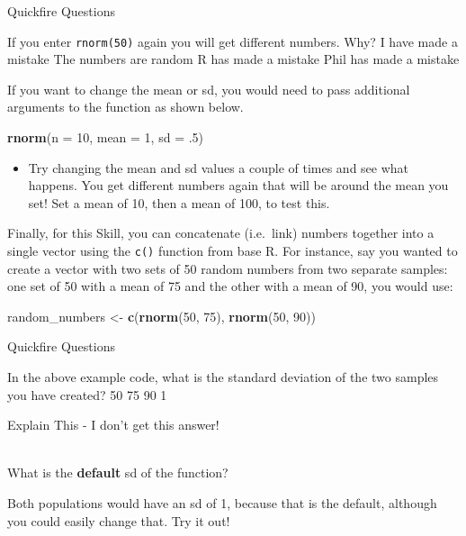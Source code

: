 \documentclass[]{book}
\newenvironment{Shaded}{\begin{snugshade}}{\end{snugshade}}
\newcommand{\DataTypeTok}[1]{\textcolor[rgb]{0.13,0.29,0.53}{#1}}
\newcommand{\DecValTok}[1]{\textcolor[rgb]{0.00,0.00,0.81}{#1}}
\newcommand{\FloatTok}[1]{\textcolor[rgb]{0.00,0.00,0.81}{#1}}
\newcommand{\KeywordTok}[1]{\textcolor[rgb]{0.13,0.29,0.53}{\textbf{#1}}}
\newcommand{\NormalTok}[1]{#1}
\newcommand{\StringTok}[1]{\textcolor[rgb]{0.31,0.60,0.02}{#1}}
\providecommand{\tightlist}{%
  \setlength{\itemsep}{0pt}\setlength{\parskip}{0pt}}
\newenvironment{info}
    {
    \hline\\
    }
    { 
    \\\\\hline
    }
\begin{document}
{Quickfire Questions}

If you enter \texttt{rnorm(50)} again you will get different numbers. Why? I have made a mistake The numbers are random R has made a mistake Phil has made a mistake

If you want to change the mean or sd, you would need to pass additional arguments to the function as shown below.

\begin{Shaded}
\begin{Highlighting}[]
\KeywordTok{rnorm}\NormalTok{(}\DataTypeTok{n =} \DecValTok{10}\NormalTok{, }\DataTypeTok{mean =} \DecValTok{1}\NormalTok{, }\DataTypeTok{sd =} \FloatTok{.5}\NormalTok{)}
\end{Highlighting}
\end{Shaded}

\begin{itemize}
\tightlist
\item
  Try changing the mean and sd values a couple of times and see what happens. You get different numbers again that will be around the mean you set! Set a mean of 10, then a mean of 100, to test this.
\end{itemize}

Finally, for this Skill, you can concatenate (i.e.~link) numbers together into a single vector using the \texttt{c()} function from base R. For instance, say you wanted to create a vector with two sets of 50 random numbers from two separate samples: one set of 50 with a mean of 75 and the other with a mean of 90, you would use:

\begin{Shaded}
\begin{Highlighting}[]
\NormalTok{random_numbers <-}\StringTok{ }\KeywordTok{c}\NormalTok{(}\KeywordTok{rnorm}\NormalTok{(}\DecValTok{50}\NormalTok{, }\DecValTok{75}\NormalTok{),}
                    \KeywordTok{rnorm}\NormalTok{(}\DecValTok{50}\NormalTok{, }\DecValTok{90}\NormalTok{))}
\end{Highlighting}
\end{Shaded}

{Quickfire Questions}

In the above example code, what is the standard deviation of the two samples you have created? 50 75 90 1

Explain This - I don't get this answer!

\begin{info}
What is the \textbf{default} sd of the function?

Both populations would have an sd of 1, because that is the default,
although you could easily change that. Try it out!
\end{info}
\end{document}
